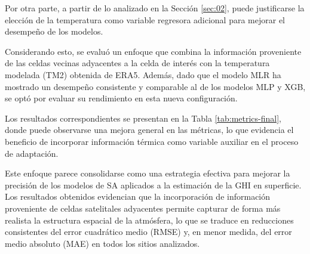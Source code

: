 Por otra parte, a partir de lo analizado en la Sección \ref{sec:02}, puede justificarse la elección de la temperatura como variable regresora adicional para mejorar el desempeño de los modelos.

Considerando esto, se evaluó un enfoque que combina la información proveniente de las celdas vecinas adyacentes a la celda de interés con la temperatura modelada (TM2) obtenida de ERA5. Además, dado que el modelo MLR ha mostrado un desempeño consistente y comparable al de los modelos MLP y XGB, se optó por evaluar su rendimiento en esta nueva configuración.

Los resultados correspondientes se presentan en la Tabla \ref{tab:metrics-final}, donde puede observarse una mejora general en las métricas, lo que evidencia el beneficio de incorporar información térmica como variable auxiliar en el proceso de adaptación.


\begin{table}%
  \centering
  
  \caption[Métricas de desempeño del modelo ERA5 adapado en los cinco sitios en el conjunto de pruebas.]{Métricas de desempeño (MBE, MAE, RMSE) del modelo ERA5 adapado en los cinco sitios en el \textbf{conjunto de pruebas}.}
  \label{tab:metrics-final}
\end{table}






Este enfoque parece consolidarse como una estrategia efectiva para mejorar la precisión de los modelos de SA aplicados a la estimación de la GHI en superficie. Los resultados obtenidos evidencian que la incorporación de información proveniente de celdas satelitales adyacentes permite capturar de forma más realista la estructura espacial de la atmósfera, lo que se traduce en reducciones consistentes del error cuadrático medio (RMSE) y, en menor medida, del error medio absoluto (MAE) en todos los sitios analizados.


